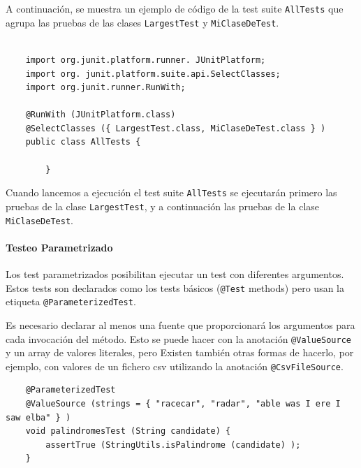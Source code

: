 A continuación, se muestra un ejemplo de código de la test suite \lstinline|AllTests| que
agrupa las pruebas de las clases \lstinline|LargestTest| y \lstinline|MiClaseDeTest|.

\begin{lstlisting}
	
	import org.junit.platform.runner. JUnitPlatform;
	import org. junit.platform.suite.api.SelectClasses;
	import org.junit.runner.RunWith;
	
	@RunWith (JUnitPlatform.class)
	@SelectClasses ({ LargestTest.class, MiClaseDeTest.class } )
	public class AllTests {
		
		}
\end{lstlisting}

Cuando lancemos a ejecución el test suite \lstinline|AllTests| se ejecutarán primero las
pruebas de la clase \lstinline|LargestTest|, y a continuación las pruebas de la clase
\lstinline|MiClaseDeTest|.

\paragraph{Testeo Parametrizado}
Los test parametrizados posibilitan ejecutar un test con
diferentes argumentos.
Estos tests son declarados como los tests
básicos (\lstinline|@Test| methods) pero usan la etiqueta
\lstinline|@ParameterizedTest|.

Es necesario declarar al menos una fuente que proporcionará
los argumentos para cada invocación del método.
Esto se puede hacer con la anotación \lstinline|@ValueSource| y un
array de valores literales,
pero Existen también otras formas de hacerlo, por ejemplo, con
valores de un fichero csv utilizando la anotación
\lstinline|@CsvFileSource|.

\begin{lstlisting}
	@ParameterizedTest
	@ValueSource (strings = { "racecar", "radar", "able was I ere I saw elba" } )
	void palindromesTest (String candidate) {
		assertTrue (StringUtils.isPalindrome (candidate) );
	}
\end{lstlisting}

